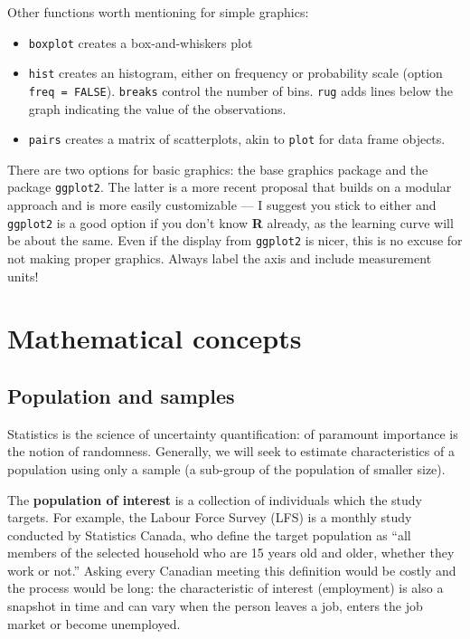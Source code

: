 \documentclass[
  11pt,
  letterpaper,
]{book}
\makeatletter
\providecommand{\tightlist}{%
  \setlength{\itemsep}{0pt}\setlength{\parskip}{0pt}}
\newenvironment{kframe}{%
\medskip{}
\setlength{\fboxsep}{.8em}
 \def\at@end@of@kframe{}%
 \ifinner\ifhmode%
  \def\at@end@of@kframe{\end{minipage}}%
  \begin{minipage}{\columnwidth}%
 \fi\fi%
 \def\FrameCommand##1{\hskip\@totalleftmargin \hskip-\fboxsep
 \colorbox{shadecolor}{##1}\hskip-\fboxsep
     \hskip-\linewidth \hskip-\@totalleftmargin \hskip\columnwidth}%
 \MakeFramed {\advance\hsize-\width
   \@totalleftmargin\z@ \linewidth\hsize
   \@setminipage}}%
 {\par\unskip\endMakeFramed%
 \at@end@of@kframe}
\newenvironment{rmdblock}[1]
  {
  \begin{itemize}
  \renewcommand{\labelitemi}{
    \raisebox{-.7\height}[0pt][0pt]{
      {\setkeys{Gin}{width=3em,keepaspectratio}\texttt{[image: images/\#1]}}
    }
  }
  \setlength{\fboxsep}{1em}
  \begin{kframe}
  \item
  }
  {
  \end{kframe}
  \end{itemize}
  }
\newenvironment{rmdnote}
  {\begin{rmdblock}{note}}
  {\end{rmdblock}}
\theoremstyle{definition}
\theoremstyle{definition}
\theoremstyle{definition}
\theoremstyle{remark}
\makeatother
\begin{document}
Other functions worth mentioning for simple graphics:

\begin{itemize}
\tightlist
\item
  \texttt{boxplot} creates a box-and-whiskers plot
\item
  \texttt{hist} creates an histogram, either on frequency or probability scale (option \texttt{freq\ =\ FALSE}). \texttt{breaks} control the number of bins. \texttt{rug} adds lines below the graph indicating the value of the observations.
\item
  \texttt{pairs} creates a matrix of scatterplots, akin to \texttt{plot} for data frame objects.
\end{itemize}

\begin{rmdnote}
There are two options for basic graphics: the base graphics package and the package \texttt{ggplot2}. The latter is a more recent proposal that builds on a modular approach and is more easily customizable --- I suggest you stick to either and \texttt{ggplot2} is a good option if you don't know \textbf{R} already, as the learning curve will be about the same. Even if the display from \texttt{ggplot2} is nicer, this is no excuse for not making proper graphics. Always label the axis and include measurement units!
\end{rmdnote}

\hypertarget{complement}{%
\chapter{Mathematical concepts}\label{complement}}

\hypertarget{population-sample}{%
\section{Population and samples}\label{population-sample}}

Statistics is the science of uncertainty quantification: of paramount importance is the notion of randomness. Generally, we will seek to estimate characteristics of a population using only a sample (a sub-group of the population of smaller size).

The \textbf{population of interest} is a collection of individuals which the study targets. For example, the Labour Force Survey (LFS) is a monthly study conducted by Statistics Canada, who define the target population as ``all members of the selected household who are 15 years old and older, whether they work or not.'' Asking every Canadian meeting this definition would be costly and the process would be long: the characteristic of interest (employment) is also a snapshot in time and can vary when the person leaves a job, enters the job market or become unemployed.
\end{document}
